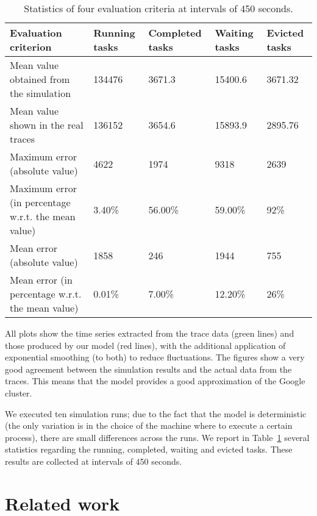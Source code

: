 \documentclass{article}
\begin{document}
\begin{table}[b]
\begin{tabular}{|p{5.5cm} |p{1.15cm} |p{1.45cm} |p{1cm} |p{1cm}| }
\hline Evaluation criterion&Running tasks&Completed tasks & Waiting tasks& Evicted tasks   \\
\hline\hline
Mean value obtained from the simulation&134476&3671.3&
15400.6&
3671.32\\
Mean value shown in the real traces&
136152&
3654.6&
15893.9&
2895.76\\
Maximum error (absolute value)&
4622&
1974&
9318&
2639\\
Maximum error (in percentage w.r.t. the mean value)&
3.40\%&
56.00\%&
59.00\%&
92\%\\
Mean error (absolute value)&
1858&
246&
1944&
755\\
Mean error (in percentage w.r.t. the mean value)&
0.01\%&
7.00\%&
12.20\%&
26\%\\
\hline
\end{tabular}
\caption{Statistics of four evaluation criteria at intervals of 450 seconds.}
\label{tab:stat}     
\end{table}


All plots show the time series extracted from the trace data (green lines) and those produced by our model (red lines), with the additional application of exponential smoothing (to both) to reduce fluctuations. The figures show a very good agreement between the simulation results and the actual data from the traces. This means that the model provides a good approximation of the Google cluster.

We executed ten simulation runs; due to the fact that the model is deterministic (the only variation is in the choice of the machine where to execute a certain process), there are small differences across the runs. We report in Table~\ref{tab:stat} several statistics regarding the running, completed, waiting and evicted tasks.  These results are collected at intervals of 450 seconds. 




\section{Related work}
\label{sec:discussion}
\end{document}
